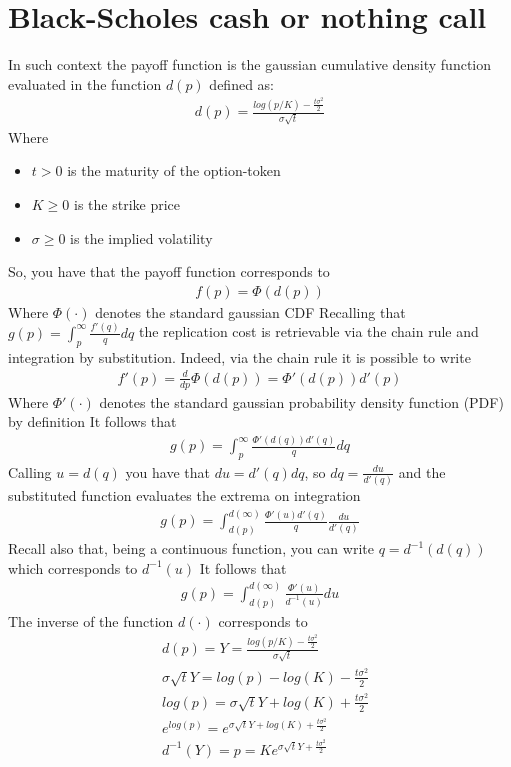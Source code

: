 \documentclass[12pt]{article}
\begin{document}
\section{Black-Scholes cash or nothing call}
In such context the payoff function is the gaussian cumulative density function evaluated in the function $d(p)$ defined as:
\begin{align*}
    d(p) = \frac{log(p/K)-\frac{t\sigma^2}{2}}{\sigma \sqrt{t}}
\end{align*}
Where
\begin{itemize}
    \item $t>0$ is the maturity of the option-token
    \item $K\geq 0$ is the strike price
    \item $\sigma \geq 0$ is the implied volatility
\end{itemize}
So, you have that the payoff function corresponds to
\begin{align*}
    f(p) = \Phi(d(p))
\end{align*}
Where $\Phi(\cdot)$ denotes the standard gaussian CDF
Recalling that $g(p)= \int_p^\infty \frac{f'(q)}{q}dq$  the replication cost is retrievable via the chain rule and integration by substitution.
Indeed, via the chain rule it is possible to write
\begin{align*}
    f'(p) = \frac{d}{dp} \Phi(d(p)) = \Phi'(d(p))d'(p)
\end{align*}
Where $\Phi'(\cdot)$ denotes the standard gaussian probability density function (PDF) by definition
It follows that
\begin{align*}
    g(p) = \int_p^\infty \frac{\Phi'(d(q))d'(q)}{q}dq
\end{align*}
Calling $u=d(q)$ you have that $du=d'(q) dq$, so $dq = \frac{du}{d'(q)}$ and the substituted function evaluates the extrema on integration
\begin{align*}
    g(p) = \int_{d(p)}^{d(\infty)} \frac{\Phi'(u)d'(q)}{q}\frac{du}{d'(q)}
\end{align*}
Recall also that, being a continuous function, you can write $q=d^{-1}(d(q))$ which corresponds to $d^{-1}(u)$
It follows that
\begin{align*}
    g(p) = \int_{d(p)}^{d(\infty)} \frac{\Phi'(u)}{d^{-1}(u)}du
\end{align*}
The inverse of the function $d(\cdot)$ corresponds to
\begin{align*}
     & d(p)       = Y = \frac{log(p/K)-\frac{t\sigma^2}{2}}{\sigma \sqrt{t}} \\
     & \sigma \sqrt{t}Y = log(p)-log(K) - \frac{t\sigma^2}{2}                \\
     & log(p) = \sigma \sqrt{t}Y + log(K) + \frac{t\sigma^2}{2}              \\
     & e^{log(p)} = e^{\sigma \sqrt{t}Y + log(K) + \frac{t\sigma^2}{2}}      \\
     & d^{-1}(Y)     = p = K e^{\sigma \sqrt{t}Y + \frac{t\sigma^2}{2}}
\end{align*}
\end{document}
